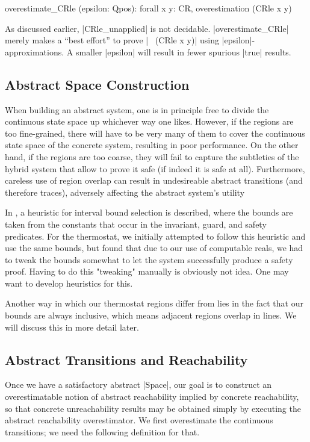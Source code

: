 \documentclass[runningheads]{llncs}
\begin{document}

\begin{code}
overestimate_CRle (epsilon: Qpos): forall x y: CR, overestimation (CRle x y)
\end{code}
As discussed earlier, |CRle_unapplied| is not
decidable. |overestimate_CRle| merely makes a ``best effort'' to prove
|~ (CRle x y)| using |epsilon|-approximations. A smaller |epsilon|
will result in fewer spurious |true| results.




\subsection{Abstract Space Construction}
\label{abs.space.constr}

When building an abstract system, one is in principle free to divide
the continuous state space up whichever way one likes. However, if the
regions are too fine-grained, there will have to be very many of them
to cover the continuous state space of the concrete system, resulting
in poor performance. On the other hand, if the regions are too coarse,
they will fail to capture the subtleties of the hybrid system that
allow to prove it safe (if indeed it is safe at all).  Furthermore,
careless use of region overlap can result in undesireable abstract
transitions (and therefore traces), adversely affecting the abstract
system's utility

In \cite{alur}, a heuristic for interval bound selection is described,
where the bounds are taken from the constants that occur in the
invariant, guard, and safety predicates. For the thermostat, we
initially attempted to follow this heuristic and use the same bounds,
but found that due to our use of computable reals, we had to tweak the
bounds somewhat to let the system successfully produce a safety
proof. 
Having to do this "tweaking" manually is obviously not idea. One may want to develop heuristics for this. 


Another way in which our thermostat regions differ from \cite{alur}
lies in the fact that our bounds are always inclusive, which means
adjacent regions overlap in lines. We will discuss this in more detail
later.

\subsection{Abstract Transitions and Reachability}
\label{abs.reach}
Once we have a satisfactory abstract |Space|, our goal is to construct
an overestimatable notion of abstract reachability implied by concrete
reachability, so that concrete unreachability results may be obtained
simply by executing the abstract reachability overestimator. We first overestimate the continuous transitions; we need the following definition for that.
\end{document}
